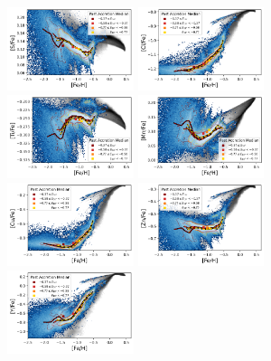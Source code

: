 \documentclass[fleqn,usenatbib]{mnras}
\begin{document}
\begin{figure}
    \includegraphics[width=0.33\textwidth]{figures/xfe_feh_zones_S.png}
    \includegraphics[width=0.33\textwidth]{figures/xfe_feh_zones_Cl.png}
    \includegraphics[width=0.33\textwidth]{figures/xfe_feh_zones_Ti.png}
    \includegraphics[width=0.33\textwidth]{figures/xfe_feh_zones_Mn.png}
    \includegraphics[width=0.33\textwidth]{figures/xfe_feh_zones_Cu.png}
    \includegraphics[width=0.33\textwidth]{figures/xfe_feh_zones_Zn.png}
    \includegraphics[width=0.33\textwidth]{figures/xfe_feh_zones_Y.png}

\end{figure}
\end{document}

